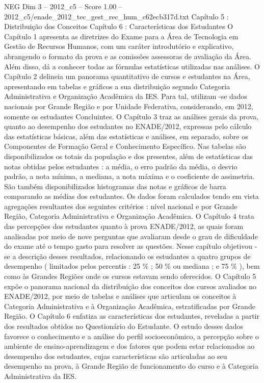 \begin{textsample}{NEG Dim 3 – 2012\_c5 – Score 1.00 – 2012\_c5/enade\_2012\_tec\_gest\_rec\_hum\_c62ecb317d.txt}  \label{ex:f3_neg_064}
Capítulo 5 : Distribuição dos Conceitos Capítulo 6 : Características dos Estudantes O Capítulo 1 apresenta as diretrizes do Exame para a Área de Tecnologia em Gestão de Recursos Humanos, com um caráter introdutório e explicativo, abrangendo o formato da prova e as comissões assessoras de avaliação da Área.
Além disso, dá a conhecer todas as fórmulas estatísticas utilizadas nas análises.
O Capítulo 2 delineia um panorama quantitativo de cursos e estudantes na Área, apresentando em tabelas e gráficos a sua distribuição segundo Categoria Administrativa e Organização Acadêmica da IES.
Para tal, utilizam -se dados nacionais por Grande Região e por Unidade Federativa, considerando, em 2012, somente os estudantes Concluintes.
O Capítulo 3 traz as análises gerais da prova, quanto ao desempenho dos estudantes no ENADE/2012, expressas pelo cálculo das estatísticas básicas, além das estatísticas e análises, em separado, sobre os Componentes de Formação Geral e Conhecimento Específico.
Nas tabelas são disponibilizados os totais da população e dos presentes, além de estatísticas das notas obtidas pelos estudantes : a média, o erro padrão da média, o desvio padrão, a nota mínima, a mediana, a nota máxima e o coeficiente de assimetria.
São também disponibilizados histogramas das notas e gráficos de barra comparando as médias dos estudantes.
Os dados foram calculados tendo em vista agregações resultantes dos seguintes critérios : nível nacional e por Grande Região, Categoria Administrativa e Organização Acadêmica.
O Capítulo 4 trata das percepções dos estudantes quanto à prova ENADE/2012, as quais foram analisadas por meio de nove perguntas que avaliaram desde o grau de dificuldade do exame até o tempo gasto para resolver as questões.
Nesse capítulo objetivou -se a descrição desses resultados, relacionando os estudantes a quatro grupos de desempenho ( limitados pelos percentis : 25 \% ; 50 \% ou mediana ; e 75 \% ), bem como às Grandes Regiões onde os cursos estavam sendo oferecidos.
O Capítulo 5 expõe o panorama nacional da distribuição dos conceitos dos cursos avaliados no ENADE/2012, por meio de tabelas e análises que articulam os conceitos à Categoria Administrativa e à Organização Acadêmica, estratificadas por Grande Região.
O Capítulo 6 enfatiza as características dos estudantes, reveladas a partir dos resultados obtidos no Questionário do Estudante.
O estudo desses dados favorece o conhecimento e a análise do perfil socioeconômico, a percepção sobre o ambiente de ensino-aprendizagem e dos fatores que podem estar relacionados ao desempenho dos estudantes, cujas características são articuladas ao seu desempenho na prova, à Grande Região de funcionamento do curso e à Categoria Administrativa da IES.

\end{textsample}
